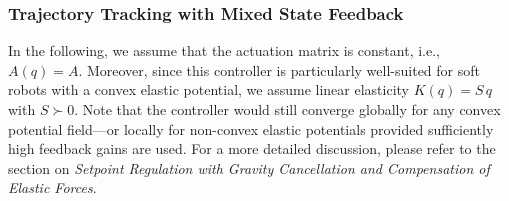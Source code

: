 \subsubsection{Trajectory Tracking with Mixed State Feedback}
In the following, we assume that the actuation matrix is constant, i.e., $A(q) = A$. Moreover, since this controller is particularly well-suited for soft robots with a convex elastic potential, we assume linear elasticity $K(q) = S \, q$ with $S \succ 0$. Note that the controller would still converge globally for any convex potential field—or locally for non-convex elastic potentials provided sufficiently high feedback gains are used. For a more detailed discussion, please refer to the section on \emph{Setpoint Regulation with Gravity Cancellation and Compensation of Elastic Forces}.

